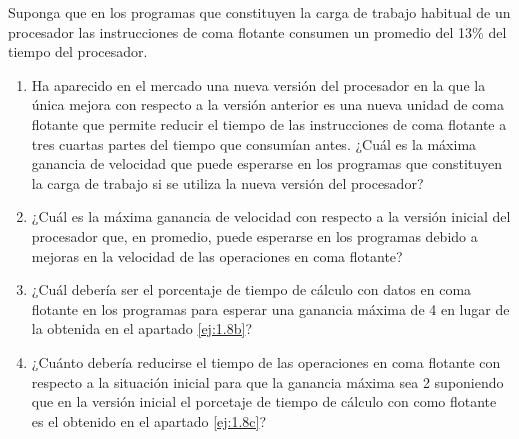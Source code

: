 \begin{ejercicio}
    Suponga que en los programas que constituyen la carga de trabajo habitual de un procesador las
    instrucciones de coma flotante consumen un promedio del 13\% del tiempo del procesador.
    \begin{enumerate}
        \item Ha aparecido en el mercado una nueva versión del procesador en la que la única mejora con respecto a la
        versión anterior es una nueva unidad de coma flotante que permite reducir el tiempo de las instrucciones de
        coma flotante a tres cuartas partes del tiempo que consumían antes. ¿Cuál es la máxima ganancia de
        velocidad que puede esperarse en los programas que constituyen la carga de trabajo si se utiliza la nueva
        versión del procesador?
        \item\label{ej:1.8b} ¿Cuál es la máxima ganancia de velocidad con respecto a la versión inicial del procesador que, en
        promedio, puede esperarse en los programas debido a mejoras en la velocidad de las operaciones en coma
        flotante?
        \item\label{ej:1.8c} ¿Cuál debería ser el porcentaje de tiempo de cálculo con datos en coma flotante en los programas para
        esperar una ganancia máxima de 4 en lugar de la obtenida en el apartado \ref{ej:1.8b}?
        \item ¿Cuánto debería reducirse el tiempo de las operaciones en coma flotante con respecto a la situación
        inicial para que la ganancia máxima sea 2 suponiendo que en la versión inicial el porcetaje de tiempo de
        cálculo con como flotante es el obtenido en el apartado \ref{ej:1.8c}?
    \end{enumerate}
\end{ejercicio}

